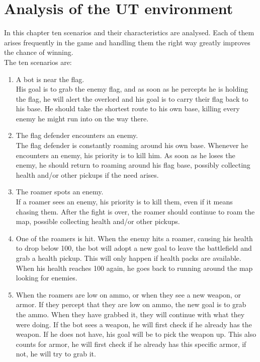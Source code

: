 \chapter{Analysis of the UT environment}
In this chapter ten scenarios and their characteristics are analysed. Each of them arises frequently in the game and handling them the right way greatly improves the chance of winning.\\
The ten scenarios are:
\begin{enumerate}
	\item A bot is near the flag. \\
	His goal is to grab the enemy flag, and as soon as he percepts he is holding the flag, he will alert the overlord and his goal is to carry their flag back to his base. He should take the shortest route to his own base, killing every enemy he might run into on the way there.\\
	\item The flag defender encounters an enemy. \\
	The flag defender is constantly roaming around his own base. Whenever he encounters an enemy, his priority is to kill him. As soon as he loses the enemy, he should return to roaming around his flag base, possibly collecting health and/or other pickups if the need arises.\\
	\item The roamer spots an enemy. \\
	If a roamer sees an enemy, his priority is to kill them, even if it means chasing them. After the fight is over, the roamer should continue to roam the map, possible collecting health and/or other pickups. \\
	\item One of the roamers is hit. 
	When the enemy hits a roamer, causing his health to drop below 100, the bot will adopt a new goal to leave the battlefield and grab a health pickup. This will only happen if health packs are available. When his health reaches 100 again, he goes back to running around the map looking for enemies.\\
	\item When the roamers are low on ammo, or when they see a new weapon, or armor. If they percept that they are low on ammo, the new goal is to grab the ammo. When they have grabbed it, they will continue with what they were doing. If the bot sees a weapon, he will first check if he already has the weapon. If he does not have, his goal will be to pick the weapon up. This also counts for armor, he will first check if he already has this specific armor, if not, he will try to grab it. \\

\end{enumerate}
